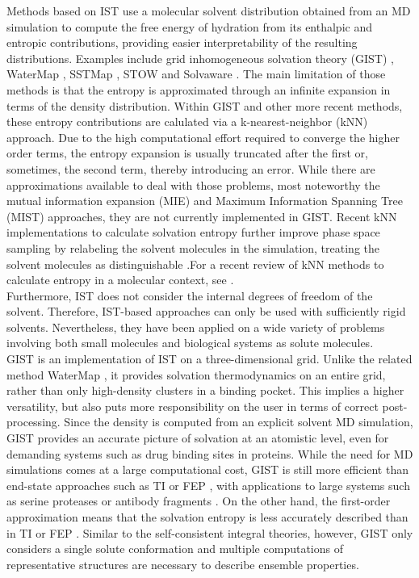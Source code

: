 \documentclass[9pt,tutorial]{livecoms}
\begin{document}
Methods based on IST use a molecular solvent distribution obtained from an MD simulation to compute the free energy of hydration from its enthalpic and entropic contributions, providing easier interpretability of the resulting distributions.
Examples include grid inhomogeneous solvation theory (GIST) \cite{Nguyen2012,Ramsey2016}, WaterMap \cite{Young2007-watermap,Abel2008-watermap}, SSTMap \cite{Haider2018-sstmap}, STOW \cite{Li2012-stow} and Solvaware \cite{Huggins2016-solvaware}.
The main limitation of those methods is that the entropy is approximated through an infinite expansion in terms of the density distribution. 
Within GIST and other more recent methods, these entropy contributions are calulated via a k-nearest-neighbor (kNN) approach.  
Due to the high computational effort required to converge the higher order terms, the entropy expansion is usually truncated after the first or, sometimes, the second \cite{Nguyen2016-gist-second-order,Waibl2022-gist-solvents} term, thereby introducing an error.
While there are approximations available to deal with those problems, most noteworthy the mutual information expansion (MIE) and Maximum Information Spanning Tree (MIST) approaches, they are not currently implemented in GIST. 
Recent kNN implementations to calculate solvation entropy further improve phase space sampling by relabeling the solvent molecules in the simulation, treating the solvent molecules as distinguishable \cite{reinhard2007estimation,heinz2019computing,heinz2021permut,fogolari2021optimal}.For a recent review of kNN methods to calculate entropy in a molecular context, see \cite{fogolari2024k}.\\
Furthermore, IST does not consider the internal degrees of freedom of the solvent.
Therefore, IST-based approaches can only be used with sufficiently rigid solvents.
Nevertheless, they have been applied on a wide variety of problems involving both small molecules and biological systems as solute molecules.\\
GIST is an implementation of IST on a three-dimensional grid. Unlike the related method WaterMap \cite{Abel2008-watermap,Young2007-watermap}, it provides solvation thermodynamics on an entire grid, rather than only high-density clusters in a binding pocket.
This implies a higher versatility, but also puts more responsibility on the user in terms of correct post-processing.
Since the density is computed from an explicit solvent MD simulation, GIST provides an accurate picture of solvation at an atomistic level, even for demanding systems such as drug binding sites in proteins.
While the need for MD simulations comes at a large computational cost, GIST is still more efficient than end-state approaches such as TI \cite{Kirkwood1935-ti} or FEP \cite{Zwanzig1954-reweighting}, with applications to large systems such as serine proteases \cite{Kraml2019-gigist} or antibody fragments \cite{Waibl2021-gist-antibodies}.
On the other hand, the first-order approximation means that the solvation entropy is less accurately described than in TI or FEP \cite{Chen2021,Waibl2021-gist-salt}. 
Similar to the self-consistent integral theories, however, GIST only considers a single solute conformation and  multiple computations of representative structures are necessary to describe ensemble properties. 
\end{document}
